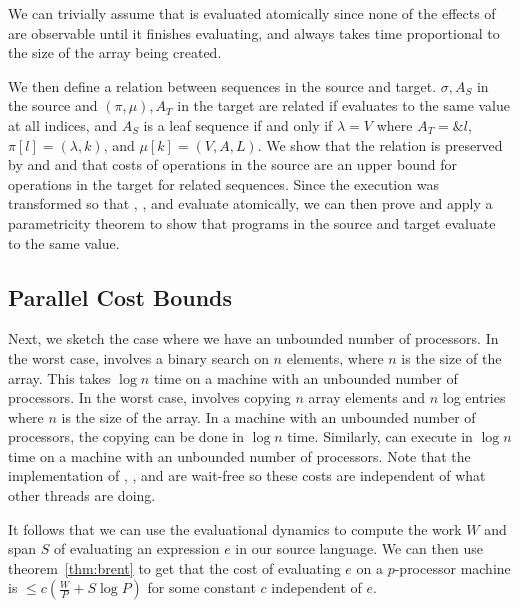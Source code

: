 We can trivially assume that \new{} is evaluated atomically since none of the effects of \new{} are observable until it finishes evaluating, and \new{} always takes time proportional to the size of the array being created.

We then define a relation between sequences in the source and target. $\sigma, A_S$ in the source and $(\pi, \mu), A_T$ in the target are related if \get{} evaluates to the same value at all indices, and $A_S$ is a leaf sequence if and only if $\lambda = V$ where $A_T = \&l$, $\pi[l] = (\lambda, k)$, and $\mu[k] = (V, A, L)$. We show that the relation is preserved by \new{} and \set{} and that costs of operations in the source are an upper bound for operations in the target for related sequences. Since the execution was transformed so that \new{}, \get{}, and \set{} evaluate atomically, we can then prove and apply a parametricity theorem to show that programs in the source and target evaluate to the same value.

\subsection{Parallel Cost Bounds}

Next, we sketch the case where we have an unbounded number of processors. In the worst case, \get{} involves a binary search on $n$ elements, where $n$ is the size of the array. This takes $\log{n}$ time on a machine with an unbounded number of processors. In the worst case, \set{} involves copying $n$ array elements and $n$ log entries where $n$ is the size of the array. In a machine with an unbounded number of processors, the copying can be done in $\log{n}$ time. Similarly, \new{} can execute in $\log{n}$ time on a machine with an unbounded number of processors. Note that the implementation of \new{}, \get{}, and \set{} are wait-free so these costs are independent of what other threads are doing.

It follows that we can use the evaluational dynamics to compute the work $W$ and span $S$ of evaluating an expression $e$ in our source language. We can then use theorem~\ref{thm:brent} to get that the cost of evaluating $e$ on a $p$-processor machine is $\leq c(\frac{W}{P} + S\log{P})$ for some constant $c$ independent of $e$.

